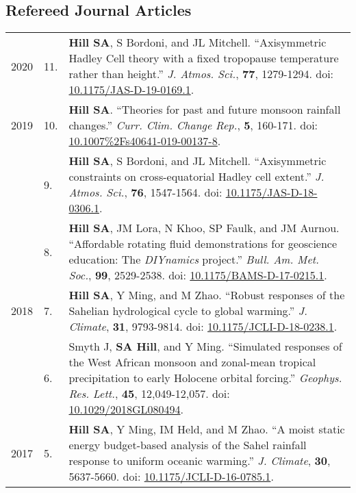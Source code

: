 \documentclass[letterpaper,11pt]{shillcv}
\begin{document}
\subsection*{Refereed Journal Articles}

\begin{longtable}{@{} Y{0.05\textwidth} >{\color{black}} p{0.04\textwidth} @{} L{0.91\textwidth} @{}}
2020 &  11. & \textbf{Hill SA}, S Bordoni, and JL Mitchell.
``Axisymmetric Hadley Cell theory with a fixed tropopause temperature rather
than height.'' \emph{J. Atmos. Sci.}, \textbf{77}, 1279-1294.  doi: \href{https://doi.org/10.1175/JAS-D-19-0169.1}{10.1175/JAS-D-19-0169.1}.\\
2019 & 10. & \textbf{Hill SA}.  ``Theories for past and future monsoon rainfall
changes.'' \emph{Curr. Clim. Change Rep.}, \textbf{5}, 160-171.  doi: \href{https://doi.org/10.1007\%2Fs40641-019-00137-8}{10.1007\%2Fs40641-019-00137-8}.\\
     & 9. & \textbf{Hill SA}, S Bordoni, and JL Mitchell.
``Axisymmetric constraints on cross-equatorial Hadley cell extent.''
\emph{J. Atmos. Sci.}, \textbf{76}, 1547-1564.  doi: \href{https://doi.org/10.1175/JAS-D-18-0306.1}{10.1175/JAS-D-18-0306.1}.\\
     & 8. & \textbf{Hill SA}, JM Lora, N Khoo, SP Faulk, and
JM Aurnou.  ``Affordable rotating fluid demonstrations for
geoscience education: The \emph{DIYnamics} project.''  \emph{Bull.
Am. Met. Soc.}, \textbf{99}, 2529-2538.  doi: \href{https://doi.org/10.1175/BAMS-D-17-0215.1}{10.1175/BAMS-D-17-0215.1}.\\
2018 & 7. & \textbf{Hill SA}, Y Ming, and M Zhao.  ``Robust responses of the
Sahelian hydrological cycle to global warming.''  \emph{J. Climate}, \textbf{31}, 9793-9814.  doi: \href{https://doi.org/10.1175/JCLI-D-18-0238.1}{10.1175/JCLI-D-18-0238.1}.\\
     & 6. & Smyth J, \textbf{SA Hill}, and Y Ming.  ``Simulated responses of
the West African monsoon and zonal-mean tropical precipitation to early
Holocene orbital forcing.''  \emph{Geophys. Res. Lett.}, \textbf{45},
12,049-12,057.  doi: \href{https://doi.org/10.1029/2018GL080494}{10.1029/2018GL080494}.\\
2017 & 5. & \textbf{Hill SA}, Y Ming, IM Held, and M Zhao.  ``A moist
static energy budget-based analysis of the Sahel rainfall response to uniform
oceanic warming.''  \emph{J. Climate}, \textbf{30}, 5637-5660.  doi: \href{https://doi.org/10.1175/JCLI-D-16-0785.1}{10.1175/JCLI-D-16-0785.1}.\\

\end{longtable}
\end{document}
